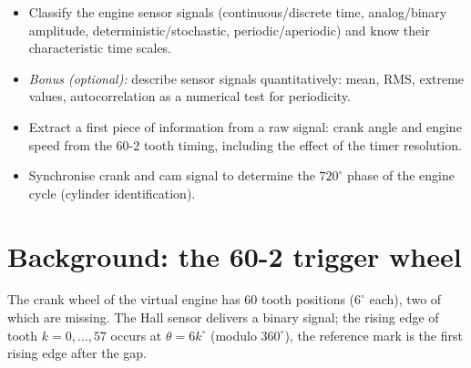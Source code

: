 
\begin{goals}
\begin{itemize}
  \item Classify the engine sensor signals (continuous/discrete time,
    analog/binary amplitude, deterministic/stochastic, periodic/aperiodic)
    and know their characteristic time scales.
  \item \emph{Bonus (optional):} describe sensor signals quantitatively:
    mean, RMS, extreme values, autocorrelation as a numerical test for
    periodicity.
  \item Extract a first piece of information from a raw signal: crank
    angle and engine speed from the 60-2 tooth timing, including the
    effect of the timer resolution.
  \item Synchronise crank and cam signal to determine the $720^\circ$
    phase of the engine cycle (cylinder identification).
\end{itemize}
\end{goals}

\section*{Background: the 60-2 trigger wheel}

The crank wheel of the virtual engine has 60 tooth positions ($6^\circ$ each),
two of which are missing. The Hall sensor delivers a binary signal; the
rising edge of tooth $k=0,\dots,57$ occurs at $\theta=6k^\circ$ (modulo
$360^\circ$), the reference mark is the first rising edge after the gap.

\begin{center}
\end{center}

